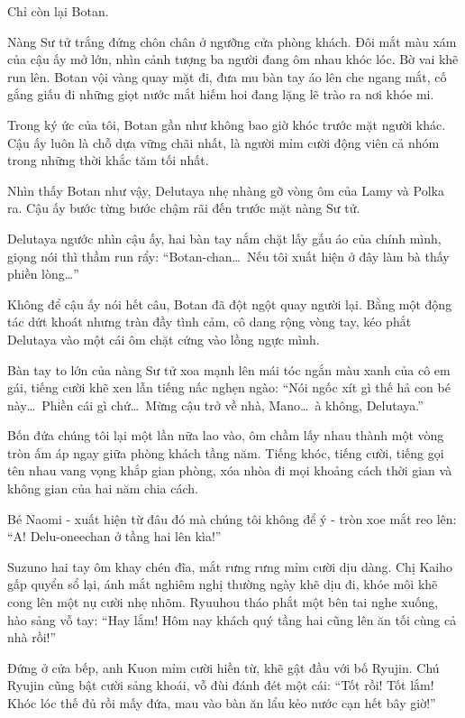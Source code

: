 \documentclass[../main.tex]{subfiles}
\begin{document}
Chỉ còn lại Botan.

Nàng Sư tử trắng đứng chôn chân ở ngưỡng cửa phòng khách. Đôi mắt màu xám của cậu ấy mở lớn, nhìn cảnh tượng ba người đang ôm nhau khóc lóc. Bờ vai khẽ run lên. Botan vội vàng quay mặt đi, đưa mu bàn tay áo lên che ngang mắt, cố gắng giấu đi những giọt nước mắt hiếm hoi đang lặng lẽ trào ra nơi khóe mi.

Trong ký ức của tôi, Botan gần như không bao giờ khóc trước mặt người khác. Cậu ấy luôn là chỗ dựa vững chãi nhất, là người mỉm cười động viên cả nhóm trong những thời khắc tăm tối nhất.

Nhìn thấy Botan như vậy, Delutaya nhẹ nhàng gỡ vòng ôm của Lamy và Polka ra. Cậu ấy bước từng bước chậm rãi đến trước mặt nàng Sư tử.

Delutaya ngước nhìn cậu ấy, hai bàn tay nắm chặt lấy gấu áo của chính mình, giọng nói thì thầm run rẩy: ``Botan-chan\dots\ Nếu tôi xuất hiện ở đây làm bà thấy phiền lòng\dots''

Không để cậu ấy nói hết câu, Botan đã đột ngột quay người lại. Bằng một động tác dứt khoát nhưng tràn đầy tình cảm, cô dang rộng vòng tay, kéo phắt Delutaya vào một cái ôm chặt cứng vào lồng ngực mình.

Bàn tay to lớn của nàng Sư tử xoa mạnh lên mái tóc ngắn màu xanh của cô em gái, tiếng cười khẽ xen lẫn tiếng nấc nghẹn ngào: ``Nói ngốc xít gì thế hả con bé này\dots\ Phiền cái gì chứ\dots\ Mừng cậu trở về nhà, Mano\dots\ à không, Delutaya.''

Bốn đứa chúng tôi lại một lần nữa lao vào, ôm chầm lấy nhau thành một vòng tròn ấm áp ngay giữa phòng khách tầng năm. Tiếng khóc, tiếng cười, tiếng gọi tên nhau vang vọng khắp gian phòng, xóa nhòa đi mọi khoảng cách thời gian và không gian của hai năm chia cách.

Bé Naomi - xuất hiện từ đâu đó mà chúng tôi không để ý - tròn xoe mắt reo lên: ``A! Delu-oneechan ở tầng hai lên kìa!''

Suzuno hai tay ôm khay chén đĩa, mắt rưng rưng mỉm cười dịu dàng. Chị Kaiho gấp quyển sổ lại, ánh mắt nghiêm nghị thường ngày khẽ dịu đi, khóe môi khẽ cong lên một nụ cười nhẹ nhõm. Ryuuhou tháo phắt một bên tai nghe xuống, hào sảng vỗ tay: ``Hay lắm! Hôm nay khách quý tầng hai cũng lên ăn tối cùng cả nhà rồi!''

Đứng ở cửa bếp, anh Kuon mỉm cười hiền từ, khẽ gật đầu với bố Ryujin. Chú Ryujin cũng bật cười sảng khoái, vỗ đùi đánh đét một cái: ``Tốt rồi! Tốt lắm! Khóc lóc thế đủ rồi mấy đứa, mau vào bàn ăn lẩu kẻo nước cạn hết bây giờ!''
\end{document}
